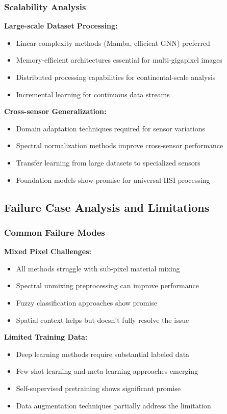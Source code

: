 \documentclass[journal]{IEEEtran}
\begin{document}
\subsubsection{Scalability Analysis}

\textbf{Large-scale Dataset Processing:}
\begin{itemize}
\item Linear complexity methods (Mamba, efficient GNN) preferred
\item Memory-efficient architectures essential for multi-gigapixel images
\item Distributed processing capabilities for continental-scale analysis
\item Incremental learning for continuous data streams
\end{itemize}

\textbf{Cross-sensor Generalization:}
\begin{itemize}
\item Domain adaptation techniques required for sensor variations
\item Spectral normalization methods improve cross-sensor performance
\item Transfer learning from large datasets to specialized sensors
\item Foundation models show promise for universal HSI processing
\end{itemize}

\subsection{Failure Case Analysis and Limitations}

\subsubsection{Common Failure Modes}

\textbf{Mixed Pixel Challenges:}
\begin{itemize}
\item All methods struggle with sub-pixel material mixing
\item Spectral unmixing preprocessing can improve performance
\item Fuzzy classification approaches show promise
\item Spatial context helps but doesn't fully resolve the issue
\end{itemize}

\textbf{Limited Training Data:}
\begin{itemize}
\item Deep learning methods require substantial labeled data
\item Few-shot learning and meta-learning approaches emerging
\item Self-supervised pretraining shows significant promise
\item Data augmentation techniques partially address the limitation
\end{itemize}
\end{document}
